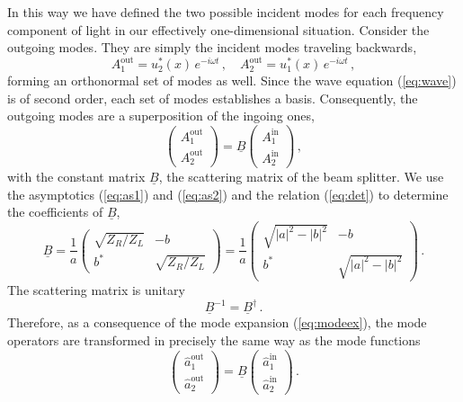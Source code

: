 \documentclass[12pt,amsmath,amssymb]{article}
\numberwithin{equation}{section}
\begin{document}
In this way we have defined the two possible incident modes for
each frequency component of light in our effectively one-dimensional
situation. Consider the outgoing modes.
They are simply the incident modes traveling backwards,
\begin{equation}
A_1^\mathrm{out} = u_2^*(x)\,e^{-i\omega t} \,,\quad
A_2^\mathrm{out} = u_1^*(x)\,e^{-i\omega t} \,,
\end{equation}
forming an orthonormal set of modes as well.
Since the wave equation (\ref{eq:wave}) is of second order,
each set of modes establishes a basis.
Consequently, the outgoing modes are a superposition of the
ingoing ones,
\begin{equation}
\left(
    \begin{array}{c}
     A_1^\mathrm{out}  \\
     A_2^\mathrm{out}
    \end{array}
\right)
=
\underline{B}
\left(
    \begin{array}{c}
     A_1^\mathrm{in}  \\
     A_2^\mathrm{in}
    \end{array}
\right)\,,
\end{equation}
with the constant matrix $\underline{B}$, the scattering matrix
of the beam splitter.
We use the asymptotics (\ref{eq:as1}) and (\ref{eq:as2}) and the relation
(\ref{eq:det}) to determine the coefficients of  $\underline{B}$,
\begin{equation}
\label{eq:mediab} \underline{B} = \frac{1}{a} \left(
    \begin{array}{cc}
      \sqrt{Z_R/Z_L} & -b \\
      b^* & \sqrt{Z_R/Z_L}
    \end{array}
\right)
=
\frac{1}{a}
\left(
    \begin{array}{cc}
      \sqrt{|a|^2 - |b|^2} & -b \\
      b^* & \sqrt{|a|^2 - |b|^2}
    \end{array}
\right) \,.
\end{equation}
The scattering matrix is unitary
\begin{equation}
\label{eq:unib}
\underline{B}^{-1} =\underline{B}^\dagger \,.
\end{equation}
Therefore, as a consequence of the mode expansion (\ref{eq:modeex}),
the mode operators are transformed in precisely the same way as the
mode functions
\begin{equation}
\left(
    \begin{array}{c}
     \hat{a}_1^\mathrm{out}  \\
     \hat{a}_2^\mathrm{out}
    \end{array}
\right)
=
\underline{B}
\left(
    \begin{array}{c}
     \hat{a}_1^\mathrm{in}  \\
     \hat{a}_2^\mathrm{in}
    \end{array}
\right)\,.
\end{equation}
\end{document}
